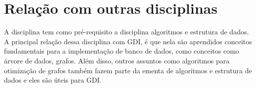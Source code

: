 \documentclass[10pt]{article}
\begin{document}
\section{Relação com outras disciplinas}
A disciplina tem como pré-requisito a disciplina algoritmos e estrutura de dados. A principal relação dessa disciplina com GDI, é que nela são aprendidos conceitos fundamentais para a implementação de banco de dados, como conceitos como árvore de dados, grafos. Além disso, outros assuntos como algoritmos para otimização de grafos também fazem parte da ementa de algoritmos e estrutura de dados e eles são úteis para GDI. \cite{CinGDI}



\end{document}
